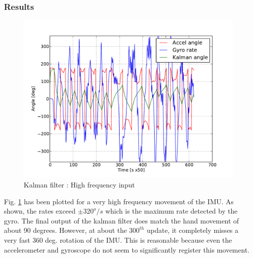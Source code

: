 \subsubsection{Results}
\begin{figure}[!h]
\centering
\includegraphics[scale=0.8]{fig/kalman_highfreq.pdf}
\caption{Kalman filter : High frequency input}
\label{fig:5_kalman_highfreq}
\end{figure}
Fig. \ref{fig:5_kalman_highfreq} has been plotted for a very high frequency movement of the IMU. As shown, the rates exceed 
$\pm320^o/s$ which is the maximum rate detected by the gyro. The final output of the kalman filter does match the hand movement
of about 90 degrees. However, at about the $300^{th}$ update, it completely misses a very fast 360 deg. rotation of the IMU. This
is reasonable because even the accelerometer and gyroscope do not seem to significantly register this movement.

